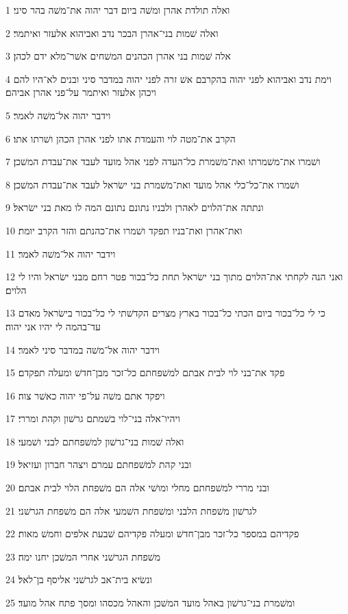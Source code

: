 \par 1 ואלה תולדת אהרן ומשׁה ביום דבר יהוה את־משׁה בהר סיני׃
\par 2 ואלה שׁמות בני־אהרן הבכר נדב ואביהוא אלעזר ואיתמר׃
\par 3 אלה שׁמות בני אהרן הכהנים המשׁחים אשׁר־מלא ידם לכהן׃
\par 4 וימת נדב ואביהוא לפני יהוה בהקרבם אשׁ זרה לפני יהוה במדבר סיני ובנים לא־היו להם ויכהן אלעזר ואיתמר על־פני אהרן אביהם׃
\par 5 וידבר יהוה אל־משׁה לאמר׃
\par 6 הקרב את־מטה לוי והעמדת אתו לפני אהרן הכהן ושׁרתו אתו׃
\par 7 ושׁמרו את־משׁמרתו ואת־משׁמרת כל־העדה לפני אהל מועד לעבד את־עבדת המשׁכן׃
\par 8 ושׁמרו את־כל־כלי אהל מועד ואת־משׁמרת בני ישׂראל לעבד את־עבדת המשׁכן׃
\par 9 ונתתה את־הלוים לאהרן ולבניו נתונם נתונם המה לו מאת בני ישׂראל׃
\par 10 ואת־אהרן ואת־בניו תפקד ושׁמרו את־כהנתם והזר הקרב יומת׃
\par 11 וידבר יהוה אל־משׁה לאמר׃
\par 12 ואני הנה לקחתי את־הלוים מתוך בני ישׂראל תחת כל־בכור פטר רחם מבני ישׂראל והיו לי הלוים׃
\par 13 כי לי כל־בכור ביום הכתי כל־בכור בארץ מצרים הקדשׁתי לי כל־בכור בישׂראל מאדם עד־בהמה לי יהיו אני יהוה׃
\par 14 וידבר יהוה אל־משׁה במדבר סיני לאמר׃
\par 15 פקד את־בני לוי לבית אבתם למשׁפחתם כל־זכר מבן־חדשׁ ומעלה תפקדם׃
\par 16 ויפקד אתם משׁה על־פי יהוה כאשׁר צוה׃
\par 17 ויהיו־אלה בני־לוי בשׁמתם גרשׁון וקהת ומררי׃
\par 18 ואלה שׁמות בני־גרשׁון למשׁפחתם לבני ושׁמעי׃
\par 19 ובני קהת למשׁפחתם עמרם ויצהר חברון ועזיאל׃
\par 20 ובני מררי למשׁפחתם מחלי ומושׁי אלה הם משׁפחת הלוי לבית אבתם׃
\par 21 לגרשׁון משׁפחת הלבני ומשׁפחת השׁמעי אלה הם משׁפחת הגרשׁני׃
\par 22 פקדיהם במספר כל־זכר מבן־חדשׁ ומעלה פקדיהם שׁבעת אלפים וחמשׁ מאות׃
\par 23 משׁפחת הגרשׁני אחרי המשׁכן יחנו ימה׃
\par 24 ונשׂיא בית־אב לגרשׁני אליסף בן־לאל׃
\par 25 ומשׁמרת בני־גרשׁון באהל מועד המשׁכן והאהל מכסהו ומסך פתח אהל מועד׃
